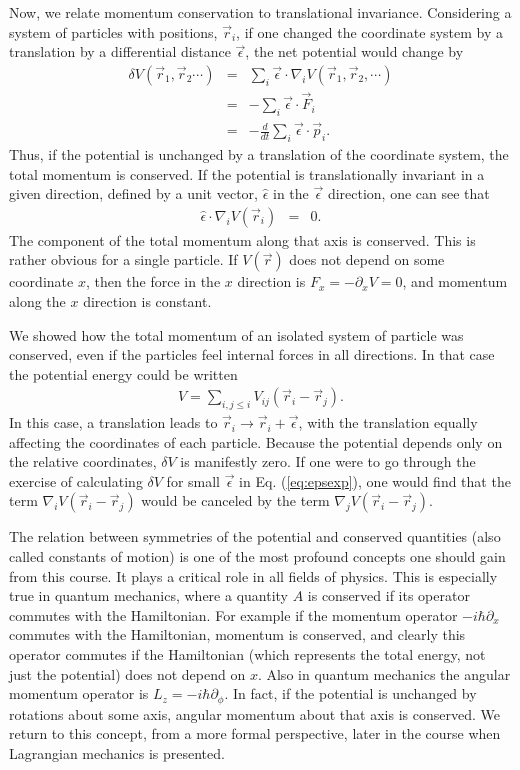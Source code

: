 Now, we relate momentum conservation to translational invariance. Considering a system of particles with positions, $\vec{r}_i$, if one changed the coordinate system by a translation by a differential distance $\vec{\epsilon}$, the net potential would change by
\begin{eqnarray}
\label{eq:epsexp}
\delta V(\vec{r}_1,\vec{r}_2\cdots)&=&\sum_i \vec{\epsilon}\cdot\nabla_i V(\vec{r}_1,\vec{r}_2,\cdots)\\
\nonumber
&=&-\sum_i \vec{\epsilon}\cdot\vec{F}_i\\
\nonumber
&=&-\frac{d}{dt}\sum_i \vec{\epsilon}\cdot\vec{p}_i.
\end{eqnarray}
Thus, if the potential is unchanged by a translation of the coordinate system, the total momentum is conserved. If the potential is translationally invariant in a given direction, defined by a unit vector, $\hat{\epsilon}$ in the $\vec{\epsilon}$ direction, one can see that
\begin{eqnarray}
\hat{\epsilon}\cdot\nabla_i V(\vec{r}_i)&=&0.
\end{eqnarray}
The component of the total momentum along that axis is conserved. This is rather obvious for a single particle. If $V(\vec{r})$ does not depend on some coordinate $x$, then the force in the $x$ direction is $F_x=-\partial_xV=0$, and momentum along the $x$ direction is constant. 

We showed how the total momentum of an isolated system of particle was conserved, even if the particles feel internal forces in all directions. In that case the potential energy could be written 
\begin{eqnarray}
V=\sum_{i,j\le i}V_{ij}(\vec{r}_i-\vec{r}_j).
\end{eqnarray}
In this case, a translation leads to $\vec{r}_i\rightarrow \vec{r}_i+\vec{\epsilon}$, with the translation equally affecting the coordinates of each particle. Because the potential depends only on the relative coordinates, $\delta V$ is manifestly zero. If one were to go through the exercise of calculating $\delta V$ for small $\vec{\epsilon}$ in Eq. (\ref{eq:epsexp}), one would find that the term $\nabla_i V(\vec{r}_i-\vec{r}_j)$ would be canceled by the term $\nabla_jV(\vec{r}_i-\vec{r}_j)$.

The relation between symmetries of the potential and conserved quantities (also called constants of motion) is one of the most profound concepts one should gain from this course. It plays a critical role in all fields of physics. This is especially true in quantum mechanics, where a quantity $A$ is conserved if its operator commutes with the Hamiltonian. For example if the momentum operator $-i\hbar\partial_x$ commutes with the Hamiltonian, momentum is conserved, and clearly this operator commutes if the Hamiltonian (which represents the total energy, not just the potential) does not depend on $x$. Also in quantum mechanics the angular momentum operator is $L_z=-i\hbar\partial_\phi$. In fact, if the potential is unchanged by rotations about some axis, angular momentum about that axis is conserved. We return to this concept, from a more formal perspective, later in the course when Lagrangian mechanics is presented.

